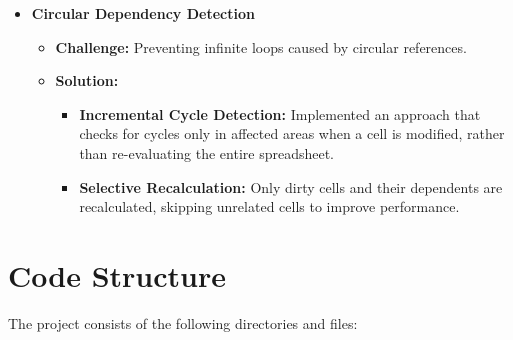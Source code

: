 \documentclass{article}
\begin{document}
\begin{itemize}
    \item \textbf{Circular Dependency Detection}
    \begin{itemize}
        \item \textbf{Challenge:} Preventing infinite loops caused by circular references.
        \item \textbf{Solution:}
        \begin{itemize}
            \item \textbf{Incremental Cycle Detection:}
            Implemented an approach that checks for cycles only in affected areas when a cell is modified, rather than re-evaluating the entire spreadsheet.
            \item \textbf{Selective Recalculation:}
            Only dirty cells and their dependents are recalculated, skipping unrelated cells to improve performance.
        \end{itemize}
    \end{itemize}

\end{itemize}

\section{Code Structure}
The project consists of the following directories and files:
\end{document}

